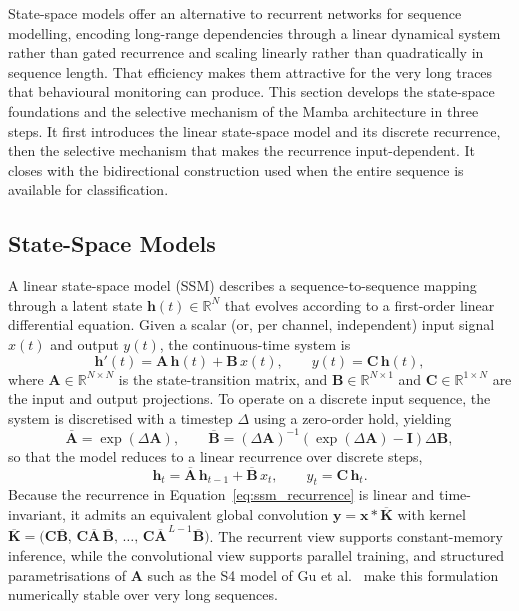 \documentclass[%
    BCOR=10mm,
    DIV=13,
    toc=bibliography,
    toc=listof,
    oneside,
    12pt,
]{scrbook}
\begin{document}
State-space models offer an alternative to recurrent networks for sequence
modelling, encoding long-range dependencies through a linear dynamical system
rather than gated recurrence and scaling linearly rather than quadratically in
sequence length. That efficiency makes them attractive for the very long traces
that behavioural monitoring can produce. This section develops the state-space
foundations and the selective mechanism of the Mamba architecture in three steps.
It first introduces the linear state-space model and its discrete recurrence,
then the selective mechanism that makes the recurrence input-dependent. It closes
with the bidirectional construction used when the entire sequence is available
for classification.

\subsection{State-Space Models}
\label{subsec:ssm}

A linear state-space model (SSM) describes a sequence-to-sequence mapping
through a latent state $\mathbf{h}(t) \in \mathbb{R}^{N}$ that evolves
according to a first-order linear differential equation. Given a scalar (or,
per channel, independent) input signal $x(t)$ and output $y(t)$, the
continuous-time system is
\begin{equation}
  \mathbf{h}'(t) = \mathbf{A}\,\mathbf{h}(t) + \mathbf{B}\,x(t),
  \qquad
  y(t) = \mathbf{C}\,\mathbf{h}(t),
  \label{eq:ssm_continuous}
\end{equation}
where $\mathbf{A} \in \mathbb{R}^{N \times N}$ is the state-transition matrix,
and $\mathbf{B} \in \mathbb{R}^{N \times 1}$ and
$\mathbf{C} \in \mathbb{R}^{1 \times N}$ are the input and output projections.
To operate on a discrete input sequence, the system is discretised
with a timestep $\Delta$ using a zero-order hold, yielding
\begin{equation}
  \overline{\mathbf{A}} = \exp(\Delta \mathbf{A}),
  \qquad
  \overline{\mathbf{B}} = (\Delta \mathbf{A})^{-1}\!\left( \exp(\Delta \mathbf{A}) - \mathbf{I} \right) \Delta \mathbf{B},
  \label{eq:ssm_discretise}
\end{equation}
so that the model reduces to a linear recurrence over discrete steps,
\begin{equation}
  \mathbf{h}_t = \overline{\mathbf{A}}\,\mathbf{h}_{t-1} + \overline{\mathbf{B}}\,x_t,
  \qquad
  y_t = \mathbf{C}\,\mathbf{h}_t.
  \label{eq:ssm_recurrence}
\end{equation}
Because the recurrence in Equation~\ref{eq:ssm_recurrence} is linear and
time-invariant, it admits an equivalent global convolution
$\mathbf{y} = \mathbf{x} * \overline{\mathbf{K}}$ with kernel
$\overline{\mathbf{K}} = \bigl( \mathbf{C}\overline{\mathbf{B}},\,
\mathbf{C}\overline{\mathbf{A}}\,\overline{\mathbf{B}},\, \ldots,\,
\mathbf{C}\overline{\mathbf{A}}^{\,L-1}\overline{\mathbf{B}} \bigr)$. The
recurrent view supports constant-memory inference, while the convolutional
view supports parallel training, and structured parametrisations of
$\mathbf{A}$ such as the S4 model of Gu et al.~\cite{gu2022s4} make this
formulation numerically stable over very long sequences.
\end{document}
